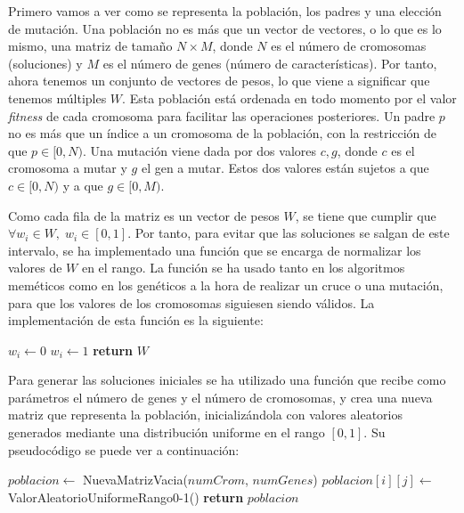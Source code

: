 \documentclass[11pt,a4paper]{article}
\begin{document}
Primero vamos a ver como se representa la población, los padres y una elección de mutación. Una población no es más que un
vector de vectores, o lo que es lo mismo, una matriz de tamaño $N \times M$, donde $N$ es el número de cromosomas (soluciones)
y $M$ es el número de genes (número de características). Por tanto, ahora tenemos un conjunto de vectores de pesos, lo que
viene a significar que tenemos múltiples $W$. Esta población está ordenada en todo momento por el valor \textit{fitness}
de cada cromosoma para facilitar las operaciones posteriores. Un padre $p$ no es más que un índice a un cromosoma de la
población, con la restricción de que $p \in [0, N)$. Una mutación viene dada por dos valores $c, g$, donde $c$ es el cromosoma
a mutar y $g$ el gen a mutar. Estos dos valores están sujetos a que $c \in [0, N)$ y a que $g \in [0, M)$.

Como cada fila de la matriz es un vector de pesos $W$, se tiene que cumplir que $\forall w_i \in W, \; w_i \in [0, 1]$. Por
tanto, para evitar que las soluciones se salgan de este intervalo, se ha implementado una función que se encarga de normalizar
los valores de $W$ en el rango. La función se ha usado tanto en los algoritmos meméticos como en los genéticos a
la hora de realizar un cruce o una mutación, para que los valores de los cromosomas siguiesen siendo válidos. La
implementación de esta función es la siguiente:

\begin{algorithm}[H]
\caption{Función que normaliza un vector de pesos $W$}
\begin{algorithmic}[1]
		\State $w_i \gets 0$
		\State $w_i \gets 1$
	\EndIf
\EndFor
\State \textbf{return} $W$
\EndFunction
\end{algorithmic}
\end{algorithm}

Para generar las soluciones iniciales se ha utilizado una función que recibe como parámetros el número de genes y el número de
cromosomas, y crea una nueva matriz que representa la población, inicializándola con valores aleatorios generados
mediante una distribución uniforme en el rango $[0, 1]$. Su pseudocódigo se puede ver a continuación:

\begin{algorithm}[H]
\caption{Función que genera una población inicial}
\begin{algorithmic}[1]
\State $poblacion \gets $ NuevaMatrizVacia($numCrom$, $numGenes$)
			\State $poblacion[i][j] \gets $ ValorAleatorioUniformeRango0-1()
		\EndFor	
	\EndFor
\State \textbf{return} $poblacion$
\EndFunction
\end{algorithmic}
\end{algorithm}
\end{document}
